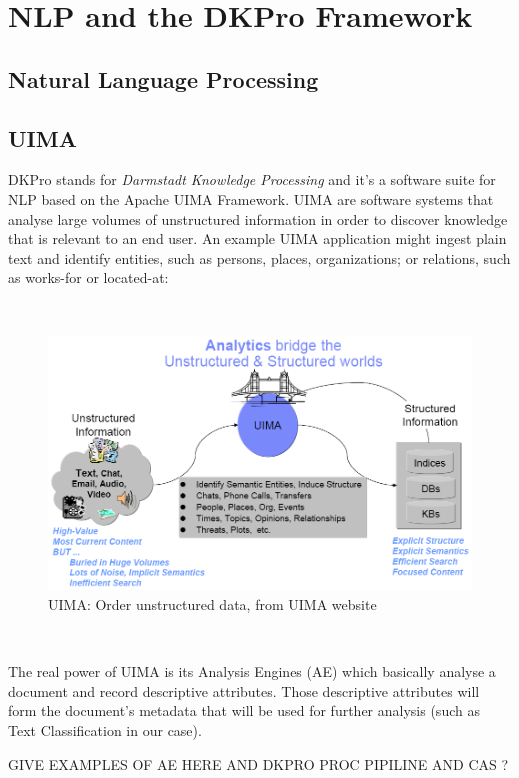 \section{NLP and the DKPro Framework}
\subsection{Natural Language Processing}
\subsection{UIMA}
DKPro stands for \emph{Darmstadt Knowledge Processing}
\cite{GurevychEtal2007dkpro0} and it's a software suite for NLP based on the Apache UIMA Framework. UIMA are software systems that analyse large volumes of unstructured information in order to discover knowledge that is relevant to an end user. An example UIMA application might ingest plain text and identify entities, such as persons, places, organizations; or relations, such as works-for or located-at:

\
\begin{figure}[ht]
    \centering
    \includegraphics[width=1\textwidth]{fig/uima.png}
    \caption[Short caption]{UIMA: Order unstructured data, from UIMA website \cite{uima:Online}}
    \label{fig:uima}
\end{figure}
\

The real power of UIMA is its Analysis Engines (AE) which basically analyse a document and record descriptive attributes. Those descriptive attributes will form the document's metadata that will be used for further analysis (such as Text Classification in our case).

GIVE EXAMPLES OF AE HERE AND DKPRO PROC PIPILINE AND CAS ?

